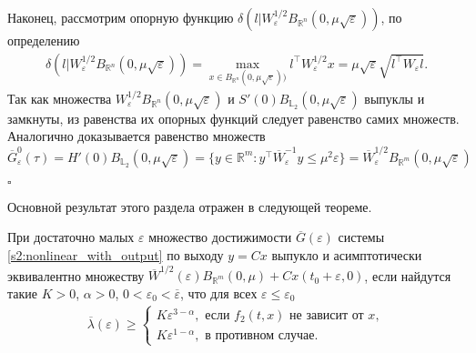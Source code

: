 \documentclass[../main.tex]{subfiles}
\begin{document}
Наконец, рассмотрим опорную функцию $\delta(l | W^{1/2}_{\varepsilon} B_{\mathbb{R}^n}(0,\mu\sqrt{\varepsilon}))$, по определению
\begin{gather*}
	\delta(l | W^{1/2}_{\varepsilon} B_{\mathbb{R}^n}(0,\mu\sqrt{\varepsilon})) = \max\limits_{x \in B_{\mathbb{R}^n}(0,\mu\sqrt{\varepsilon}))} l^{\top} W^{1/2}_{\varepsilon} x = \mu\sqrt{\varepsilon} \sqrt{l^{\top} W_{\varepsilon} l}.
\end{gather*}
Так как множества $W^{1/2}_{\varepsilon} B_{\mathbb{R}^n}(0,\mu\sqrt{\varepsilon}) $ и $S'(0) B_{\mathbb{L}_2}(0,\mu\sqrt{\varepsilon})$ выпуклы и замкнуты, из равенства их опорных функций следует равенство самих множеств. 
Аналогично доказывается равенство множеств $\overline{G}^0_{\varepsilon}(\tau) = H'(0) B_{\mathbb{L}_2}(0,\mu\sqrt{\varepsilon}) = \{ y \in \mathbb{R}^m: y^{\top} \overline{W}^{-1}_{\varepsilon} y \leqslant \mu^2 \varepsilon \} = \overline{W}^{1/2}_{\varepsilon} B_{\mathbb{R}^m}(0,\mu\sqrt{\varepsilon})$

 \hfill $\square$
 
Основной результат этого раздела отражен в следующей теореме.
\begin{theorem}\label{s2:th:assimptotic_equality}
 При достаточно малых $ \varepsilon $ множество достижимости $ \overline{G}(\varepsilon) $ системы \eqref{s2:nonlinear_with_output} по выходу $ y = C x $ выпукло и асимптотически эквивалентно множеству $\overline{W}^{1/2}(\varepsilon)B_{\mathbb{R}^m}(0,\mu) + Cx(t_0+\varepsilon,0)$, если найдутся такие $ K>0 $, $ \alpha > 0 $, $ 0< \varepsilon_0<\overline{\varepsilon} $, что для всех $ \varepsilon \leqslant \varepsilon_0 $
 \begin{gather}\label{s2:cond1}
 \overline{\lambda}(\varepsilon) \geqslant \left\{ {\begin{array}{*{20}{l}}
 {K\varepsilon ^{3 - \alpha}, \mbox{\ если \ } f_2(t,x) \mbox{\ не зависит от \ } x}, \\
 {K\varepsilon ^{1 - \alpha}}, \mbox{\ в противном случае}.
 \end{array}} \right.
 \end{gather}
\end{theorem}
 
\end{document}
